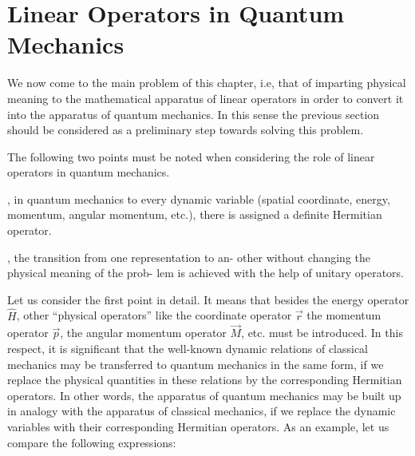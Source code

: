 \documentclass[a4paper,sfsidenotes,colorlinks=true]{tufte-book}
\numberwithin{equation}{section}
\numberwithin{figure}{section}
\begin{document}
\section{Linear Operators in Quantum Mechanics}
\label{sec-19}
We now come to the main problem of this chapter, i.e, that of imparting physical meaning to the mathematical apparatus of linear operators in order to convert it into the apparatus of quantum mechanics. In this sense the previous section should be considered as a preliminary step towards solving this problem.

The following two
points must be noted when considering the role of linear operators
in quantum mechanics. 
\begin{description}[leftmargin=1cm]
\item[Firstly], in quantum mechanics to every dynamic variable (spatial
coordinate, energy, momentum, angular momentum, etc.), there is
assigned a definite Hermitian operator. 
\item[Secondly], the transition from one representation to an- other
  without changing the physical meaning of the prob- lem is achieved
  with the help of unitary operators.
\end{description}
Let us consider the first point in detail. It means that besides the
energy operator$\hat{H}$, other ``physical operators'' like the
coordinate operator $\vec{r}$ the momentum operator $\vec{p}$, the
angular momentum operator $\vec{M}$, etc. must be introduced. In
this respect, it is significant that the well-known dynamic relations
of classical mechanics may be transferred to quantum mechanics in the
same form, if we replace the physical quantities in these relations by
the corresponding Hermitian operators. In other words, the apparatus
of quantum mechanics may be built up in analogy with the apparatus of
classical mechanics, if we replace the dynamic variables with their
corresponding Hermitian operators. As an example, let us compare the
following expressions:
\end{document}

